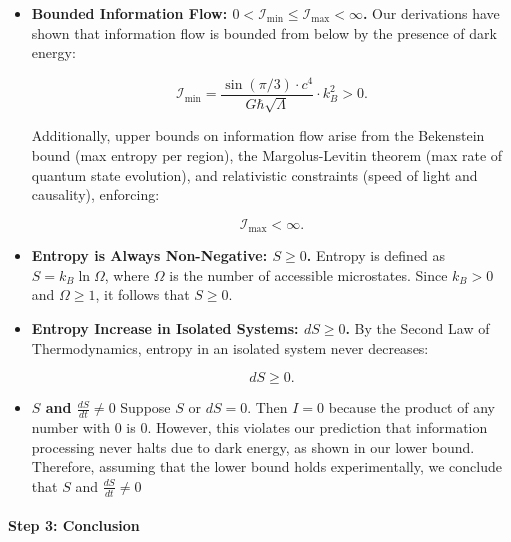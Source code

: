 \documentclass[12pt]{article}
\begin{document}
\begin{itemize}
    \item \textbf{Bounded Information Flow: \( 0 < \mathcal{I}_{\min} \leq \mathcal{I}_{\max} < \infty \).}  
    Our derivations have shown that information flow is bounded from below by the presence of dark energy:

    \begin{equation}
        \mathcal{I}_{\min} = \frac{\sin(\pi / 3) \cdot c^4}{G \hbar \sqrt{\Lambda}} \cdot k_B^2 > 0.
    \end{equation}

    Additionally, upper bounds on information flow arise from the Bekenstein bound (max entropy per region), the Margolus-Levitin theorem (max rate of quantum state evolution), and relativistic constraints (speed of light and causality), enforcing:

    \begin{equation}
        \mathcal{I}_{\max} < \infty.
    \end{equation}

    \item \textbf{Entropy is Always Non-Negative: \( S \geq 0 \).}  
    Entropy is defined as \( S = k_B \ln \Omega \), where \( \Omega \) is the number of accessible microstates. Since \( k_B > 0 \) and \( \Omega \geq 1 \), it follows that \( S \geq 0 \).
    
    \item \textbf{Entropy Increase in Isolated Systems: \( dS \geq 0 \).}  
    By the Second Law of Thermodynamics, entropy in an isolated system never decreases:

    \begin{equation}
        dS \geq 0.
    \end{equation}

    \item \textbf{$S$ and $\frac{dS}{dt} \neq 0$}  
    Suppose $S$ or $dS = 0$. Then $I = 0$ because the product of any number with $0$ is $0$. However, this violates our prediction that information processing never halts due to dark energy, as shown in our lower bound. Therefore, assuming that the lower bound holds experimentally, we conclude that $S$ and $\frac{dS}{dt} \neq 0$

\end{itemize}

\paragraph{Step 3: Conclusion}
\end{document}
